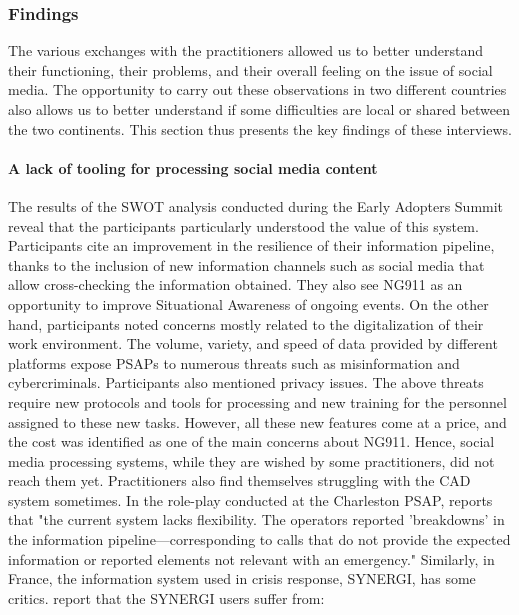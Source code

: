 \subsubsection{Findings}
The various exchanges with the practitioners allowed us to better understand their functioning, their problems, and their overall feeling on the issue of social media.
The opportunity to carry out these observations in two different countries also allows us to better understand if some difficulties are local or shared between the two continents.
This section thus presents the key findings of these interviews.

\paragraph{A lack of tooling for processing social media content}
The results of the SWOT analysis conducted during the Early Adopters Summit reveal that the participants particularly understood the value of this system.
Participants cite an improvement in the resilience of their information pipeline, thanks to the inclusion of new information channels such as social media that allow cross-checking the information obtained.
They also see NG911 as an opportunity to improve Situational Awareness of ongoing events.
On the other hand, participants noted concerns mostly related to the digitalization of their work environment.
The volume, variety, and speed of data provided by different platforms expose PSAPs to numerous threats such as misinformation and cybercriminals.
Participants also mentioned privacy issues.
The above threats require new protocols and tools for processing and new training for the personnel assigned to these new tasks.
However, all these new features come at a price, and the cost was identified as one of the main concerns about NG911.
Hence, social media processing systems, while they are wished by some practitioners, did not reach them yet.
Practitioners also find themselves struggling with the CAD system sometimes.
In the role-play conducted at the Charleston PSAP, \textcite{graceRolePlayingNext2019} reports that "the current system lacks flexibility. The operators reported 'breakdowns' in the information pipeline—corresponding to calls that do not provide the expected information or reported elements not relevant with an emergency."
Similarly, in France, the information system used in crisis response, SYNERGI, has some critics.
\textcite{linotPerspectiveComputationnelleDefi2018} report that the SYNERGI users suffer from:

